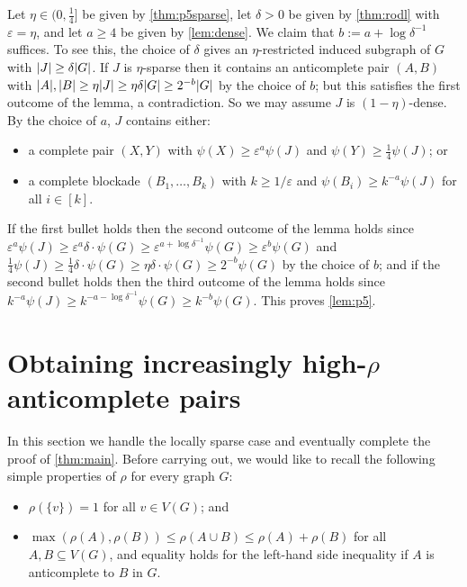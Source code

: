 \documentclass[11pt,reqno]{amsart}
\let\oldendproof\endproof
\renewenvironment{proof}[1][\proofname]{%
	\oldproof[\normalfont\bfseries #1]%
}{\oldendproof}
\newcommand{\eps}{\varepsilon}
\renewcommand{\subset}{\subseteq}
\DeclarePairedDelimiter\abs{\lvert}{\rvert}%
\begin{document}
	\begin{proof}
		Let $\eta\in(0,\frac14]$ be given by \cref{thm:p5sparse}, 
		let $\delta>0$ be given by \cref{thm:rodl} with $\eps=\eta$, and let $a\ge4$ be given by \cref{lem:dense}.
		We claim that $b:=a+\log\delta^{-1}$ suffices.
		To see this, the choice of $\delta$ gives an $\eta$-restricted induced subgraph of $G$ with $\abs J\ge \delta\abs G$.
		If $J$ is $\eta$-sparse then it contains an anticomplete pair $(A,B)$ with $\abs A,\abs B\ge \eta\abs J\ge \eta\delta\abs G\ge 2^{-b}\abs G$ by the choice of $b$; but this satisfies the first outcome of the lemma, a contradiction.
		So we may assume $J$ is $(1-\eta)$-dense.
		By the choice of $a$, $J$ contains either:
		\begin{itemize}
			\item a complete pair $(X,Y)$ with $\psi(X)\ge \eps^a\psi(J)$ and $\psi(Y)\ge\frac14\psi(J)$; or
			
			\item a complete blockade $(B_1,\ldots,B_k)$ with $k\ge1/\eps$ and $\psi(B_i)\ge k^{-a}\psi(J)$ for all $i\in[k]$.
		\end{itemize}
		
		If the first bullet holds then the second outcome of the lemma holds since $\eps^a\psi(J)\ge \eps^{a}\delta\cdot\psi(G)\ge \eps^{a+\log\delta^{-1}}\psi(G)\ge \eps^{b}\psi(G)$
		and $\frac14\psi(J)\ge\frac14\delta\cdot\psi(G)\ge \eta\delta\cdot\psi(G)\ge 2^{-b}\psi(G)$ by the choice of $b$;
		and if the second bullet holds then the third outcome of the lemma holds since $k^{-a}\psi(J)\ge k^{-a-\log\delta^{-1}}\psi(G)\ge k^{-b}\psi(G)$.
		This proves \cref{lem:p5}.
	\end{proof}
	
	\section{Obtaining increasingly high-$\rho$ anticomplete pairs}
	\label{sec:anti}
	
	In this section we handle the locally sparse case and eventually complete the proof of \cref{thm:main}.
	Before carrying out, we would like to recall the following simple properties of $\rho$ for every graph $G$:
	\begin{itemize}
		\item $\rho(\{v\})=1$ for all $v\in V(G)$; and
		
		\item $\max(\rho(A),\rho(B))\le\rho(A\cup B)\le\rho(A)+\rho(B)$ for all $A,B\subset V(G)$, and equality holds for the left-hand side inequality if $A$ is anticomplete to $B$ in $G$.
	\end{itemize} 
	
\end{document}
